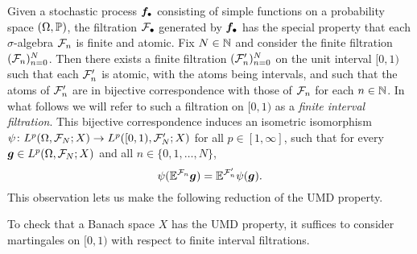 Given a stochastic process $\mb{f}_{\bullet}$ consisting of simple functions on a probability space $(\Omega,\P)$, the filtration $\mc{F}_{\bullet}$ generated by $\mb{f}_{\bullet}$ has the special property that each $\sigma$-algebra $\mc{F}_{n}$ is finite and atomic.
Fix $N \in \N$ and consider the finite filtration $(\mc{F}_{n})_{n=0}^{N}$.
Then there exists a finite filtration $(\mc{F}_{n}')_{n=0}^{N}$ on the unit interval $[0,1)$ such that each $\mc{F}_{n}'$ is atomic, with the atoms being intervals, and such that the atoms of $\mc{F}_{n}'$ are in bijective correspondence with those of $\mc{F}_{n}$ for each $n \in \N$.
In what follows we will refer to such a filtration on $[0,1)$ as a \emph{finite interval filtration}.
This bijective correspondence induces an isometric isomorphism $\psi \colon L^p(\Omega,\mc{F}_{N};X) \to L^p([0,1),\mc{F}_{N}';X)$ for all $p \in [1,\infty]$, such that for every $\mb{g} \in L^p(\Omega, \mc{F}_{N};X)$ and all $n \in \{0,1,\ldots,N\}$,
\begin{equation*}
  \psi(\E^{\mc{F}_{n}} \mb{g}) = \E^{\mc{F}_{n}'} \psi(\mb{g}). 
\end{equation*}
This observation lets us make the following reduction of the UMD property.

\begin{prop}\label{prop:UMD-FIF}
  To check that a Banach space $X$ has the UMD property, it suffices to consider martingales on $[0,1)$ with respect to finite interval filtrations.
\end{prop}

